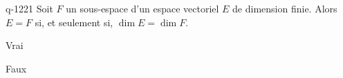 \begin{truefalse}{q-1221}
Soit $F$ un sous-espace d'un espace vectoriel $E$ de dimension finie. Alors $E=F$ si, et seulement si, $\dim E=\dim F$.
\item* Vrai
\item Faux
\end{truefalse}

